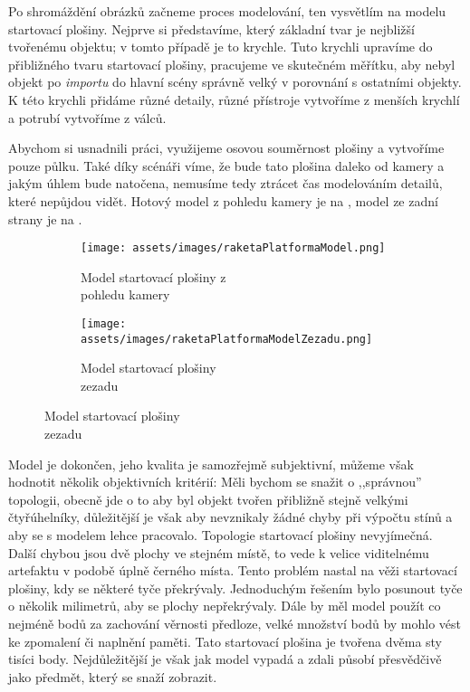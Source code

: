 {Po shromáždění obrázků začneme proces modelování, ten vysvětlím na modelu startovací plošiny. Nejprve si představíme, který základní tvar je nejbližší tvořenému objektu; v tomto případě je to krychle. Tuto krychli upravíme do přibližného tvaru startovací plošiny, pracujeme ve skutečném měřítku, aby nebyl objekt po \textit{importu} do hlavní scény správně velký v porovnání s ostatními objekty. K této krychli přidáme různé detaily, různé přístroje vytvoříme z menších krychlí a potrubí vytvoříme z válců.}

\newpage

{Abychom si usnadnili práci, využijeme osovou souměrnost plošiny a vytvoříme pouze půlku. Také díky scénáři víme, že bude tato plošina daleko od kamery a jakým úhlem bude natočena, nemusíme tedy ztrácet čas modelováním detailů, které nepůjdou vidět. Hotový model z pohledu kamery je na , model ze zadní strany je na .}

\begin{figure}[H]
    \centering
    \begingroup
    \makeatletter
    \renewcommand\thesubfigure{\thefigure~--~\@nameuse{subfiglabel@\alph{subfigure}}}
    \newcommand{\subfiglabel@a}{vlevo}
    \newcommand{\subfiglabel@b}{vpravo}
    \captionsetup[subfigure]{labelformat=simple, labelsep=colon}
    \renewcommand\p@subfigure{}
    \makeatother
    \begin{subfigure}{.48\textwidth}
        \centering
        \texttt{[image: assets/images/raketaPlatformaModel.png]}
        \caption{Model startovací plošiny z \\pohledu kamery \jaObr}
        \label{obr:plosinaModel}
    \end{subfigure}
    \hfill
    \begin{subfigure}{.48\textwidth}
        \centering
        \texttt{[image: assets/images/raketaPlatformaModelZezadu.png]}
        \caption{Model startovací plošiny \\zezadu \jaObr}
        \label{obr:plosinaModelZezadu}
    \end{subfigure}
    \endgroup
\end{figure}

{Model je dokončen, jeho kvalita je samozřejmě subjektivní, můžeme však hodnotit několik objektivních kritérií:}\odst 
{Měli bychom se snažit o ,,správnou'' topologii, obecně jde o to aby byl objekt tvořen přibližně stejně velkými čtyřúhelníky, důležitější je však aby nevznikaly žádné chyby při výpočtu stínů a aby se s modelem lehce pracovalo. Topologie startovací plošiny nevyjímečná.}\odst
{Další chybou jsou dvě plochy ve stejném místě, to vede k velice viditelnému artefaktu v podobě úplně černého místa. Tento problém nastal na věži startovací plošiny, kdy se některé tyče překrývaly. Jednoduchým řešením bylo posunout tyče o několik milimetrů, aby se plochy nepřekrývaly.}\odst
{Dále by měl model použít co nejméně bodů za zachování věrnosti předloze, velké množství bodů by mohlo vést ke zpomalení či naplnění paměti. Tato startovací plošina je tvořena dvěma sty tisíci body.}\odst
{Nejdůležitější je však jak model vypadá a zdali působí přesvědčivě jako předmět, který se snaží zobrazit.}

